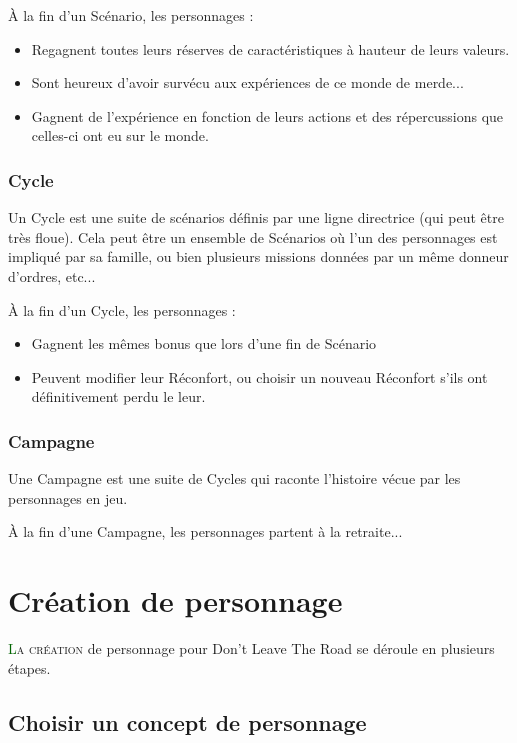 À la fin d'un Scénario, les personnages :

\begin{itemize}
	\item Regagnent toutes leurs réserves de caractéristiques à hauteur de leurs valeurs.
	\item Sont heureux d'avoir survécu aux expériences de ce monde de merde...
	\item Gagnent de l'expérience en fonction de leurs actions et des répercussions que celles-ci ont eu sur le monde.
\end{itemize}

\subsubsection*{Cycle}

Un Cycle est une suite de scénarios définis par une ligne directrice (qui peut être très floue). Cela peut être un ensemble de Scénarios où l'un des personnages est impliqué par sa famille, ou bien plusieurs missions données par un même donneur d'ordres, etc...

À la fin d'un Cycle, les personnages :

\begin{itemize}
	\item Gagnent les mêmes bonus que lors d'une fin de Scénario
	\item Peuvent modifier leur Réconfort, ou choisir un nouveau Réconfort s'ils ont définitivement perdu le leur.
\end{itemize}

\subsubsection*{Campagne}

Une Campagne est une suite de Cycles qui raconte l'histoire vécue par les personnages en jeu.

À la fin d'une Campagne, les personnages partent à la retraite...

\newpage

\section{Création de personnage}

\lettrine[lines=3]{\initfamily\textcolor{darkgreen}{L}}{a création} de personnage pour Don't Leave The Road se déroule en plusieurs étapes.

\subsection{Choisir un concept de personnage}


